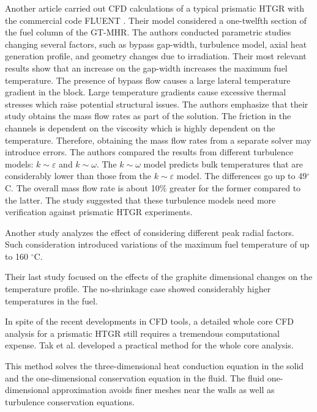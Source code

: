 \documentclass[11pt,letterpaper]{article}
\begin{document}
Another article \cite{sato_computational_2010} carried out \gls{CFD} calculations of a typical prismatic \gls{HTGR} with the commercial code FLUENT \cite{fluent_inc_fluent_2006}.
Their model considered a one-twelfth section of the fuel column of the GT-MHR.
The authors conducted parametric studies changing several factors, such as bypass gap-width, turbulence model, axial heat generation profile, and geometry changes due to irradiation.
Their most relevant results show that an increase on the gap-width increases the maximum fuel temperature.
The presence of bypass flow causes a large lateral temperature gradient in the block.
Large temperature gradients cause excessive thermal stresses which raise potential structural issues.
The authors emphasize that their study obtains the mass flow rates as part of the solution.
The friction in the channels is dependent on the viscosity which is highly dependent on the temperature.
Therefore, obtaining the mass flow rates from a separate solver may introduce errors.
The authors compared the results from different turbulence models: $k \sim \varepsilon$ and $k \sim \omega$.
The $k \sim \omega$ model predicts bulk temperatures that are considerably lower than those from the $k \sim \varepsilon$ model.
The differences go up to 49$^{\circ}$C.
The overall mass flow rate is about 10$\%$ greater for the former compared to the latter.
The study suggested that these turbulence models need more verification against prismatic HTGR experiments.

Another study analyzes the effect of considering different peak radial factors. Such consideration introduced variations of the maximum fuel temperature of up to 160 $^{\circ}$C.

Their last study focused on the effects of the graphite dimensional changes on the temperature profile.
The no-shrinkage case showed considerably higher temperatures in the fuel.


In spite of the recent developments in CFD tools, a detailed whole core CFD analysis for a prismatic \gls{HTGR} still requires a tremendous computational expense.
Tak et al. \cite{tak_practical_2012} developed a practical method for the whole core analysis.

This method solves the three-dimensional heat conduction equation in the solid and the one-dimensional conservation equation in the fluid.
The fluid one-dimensional approximation avoids finer meshes near the walls as well as turbulence conservation equations.
\end{document}
